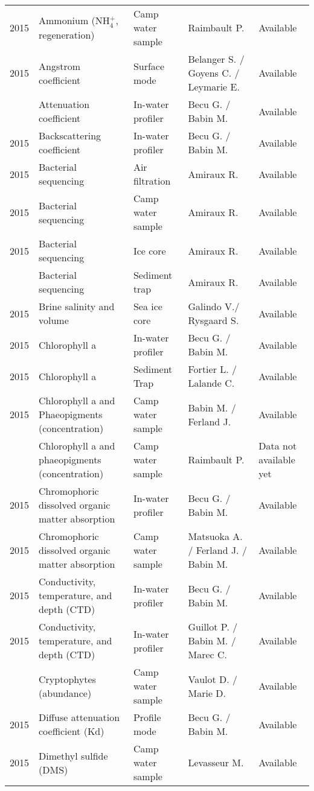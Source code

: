 \documentclass[]{article}
\begin{document}
\begin{landscape}
\begin{longtable}{rllll}
2015 & Ammonium (NH$^+_4$, regeneration) & Camp water sample & Raimbault P. & Available\\
2015 & Angstrom coefficient & Surface mode & Belanger S. / Goyens C. / Leymarie E. & Available\\
\addlinespace
2015 & Attenuation coefficient & In-water profiler & Becu G. / Babin M. & Available\\
2015 & Backscattering coefficient & In-water profiler & Becu G. / Babin M. & Available\\
2015 & Bacterial sequencing & Air filtration & Amiraux R. & Available\\
2015 & Bacterial sequencing & Camp water sample & Amiraux R. & Available\\
2015 & Bacterial sequencing & Ice core & Amiraux R. & Available\\
\addlinespace
2015 & Bacterial sequencing & Sediment trap & Amiraux R. & Available\\
2015 & Brine salinity and volume & Sea ice core & Galindo V./ Rysgaard S. & Available\\
2015 & Chlorophyll a & In-water profiler & Becu G. / Babin M. & Available\\
2015 & Chlorophyll a & Sediment Trap & Fortier L. / Lalande C. & Available\\
2015 & Chlorophyll a and Phaeopigments (concentration) & Camp water sample & Babin M. / Ferland J. & Available\\
\addlinespace
2015 & Chlorophyll a and phaeopigments (concentration) & Camp water sample & Raimbault P. & Data not available yet\\
2015 & Chromophoric dissolved organic matter absorption & In-water profiler & Becu G. / Babin M. & Available\\
2015 & Chromophoric dissolved organic matter absorption & Camp water sample & Matsuoka A. / Ferland J. / Babin M. & Available\\
2015 & Conductivity, temperature, and depth (CTD) & In-water profiler & Becu G. / Babin M. & Available\\
2015 & Conductivity, temperature, and depth (CTD) & In-water profiler & Guillot P. / Babin M. / Marec C. & Available\\
\addlinespace
2015 & Cryptophytes (abundance) & Camp water sample & Vaulot D. / Marie D. & Available\\
2015 & Diffuse attenuation coefficient (Kd) & Profile mode & Becu G. / Babin M. & Available\\
2015 & Dimethyl sulfide (DMS) & Camp water sample & Levasseur M. & Available\\

\end{longtable}
\end{landscape}
\end{document}
